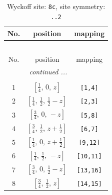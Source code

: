\documentclass[fleqn,8pt]{jsarticle}
\begin{document}
\begin{longtable}{ccc}
\caption{Wyckoff site: {\tt 8c}, site symmetry: {\tt ..2}}
 \\
 \hline \hline
No. & position & mapping \\ \hline \endfirsthead

\multicolumn{2}{l}{\tablename\ \thetable{}} \\
 \hline \hline
No. & position & mapping \\ \hline \endhead

 \hline \hline
\multicolumn{2}{r}{\footnotesize\it continued ...} \\ \endfoot

 \hline \hline
\multicolumn{2}{r}{} \\ \endlastfoot

1 & $\left[ \frac{1}{4},\, 0,\, z \right]$ & {\tt [1,4]} \\ \hline
2 & $\left[ \frac{1}{4},\, \frac{1}{2},\, \frac{1}{2} - z \right]$ & {\tt [2,3]} \\ \hline
3 & $\left[ \frac{3}{4},\, 0,\, - z \right]$ & {\tt [5,8]} \\ \hline
4 & $\left[ \frac{3}{4},\, \frac{1}{2},\, z + \frac{1}{2} \right]$ & {\tt [6,7]} \\ \hline
5 & $\left[ \frac{1}{4},\, 0,\, z + \frac{1}{2} \right]$ & {\tt [9,12]} \\ \hline
6 & $\left[ \frac{1}{4},\, \frac{1}{2},\, - z \right]$ & {\tt [10,11]} \\ \hline
7 & $\left[ \frac{3}{4},\, 0,\, \frac{1}{2} - z \right]$ & {\tt [13,16]} \\ \hline
8 & $\left[ \frac{3}{4},\, \frac{1}{2},\, z \right]$ & {\tt [14,15]} \\
\end{longtable}
\renewcommand{\arraystretch}{1.2}
\end{document}
